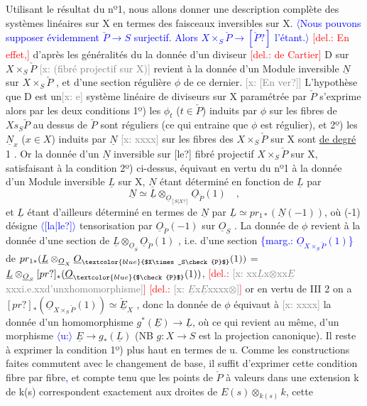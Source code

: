\documentclass[11pt]{article}
\newcommand{\hand}[1]{\textcolor{blue}{#1}}
\let\over\relax
\newcommand{\over}[2]{\textcolor{gray}{#1}\textcolor{blue}{\ensuremath{^{\!\nearrow}}#2}}
\newcommand{\inserted}[2][]{\textcolor{blue}{$\langle$#2$\rangle$}}
\newcommand{\margin}[1]{\textcolor{blue}{\{\textsf{marg.:} #1\}}}
\newcommand{\deleted}[1]{\textcolor{red}{[\textsf{del.:} #1]}}
\newcommand{\xout}[1]{\textcolor{gray}{[\textsf{x:} #1]}}
\newcommand{\uline}[1]{\underline{#1}}
\newcommand{\unsure}[1]{[#1?]}
\begin{document}
Utilisant le résultat du nº1, nous allons donner une description
complète des systèmes linéaires sur X en termes des faisceaux inversibles
sur X. \inserted{Nous pouvons supposer évidemment $\check{P}\to S$ surjectif. Alors $X\times_S\check{P}\to \unsure{\check{P}}$ l'étant.} \deleted{En effet,} d'après les généralités du \over{nº2}{\unsure{\S 20.3}} la donnée d'un
diviseur \deleted{de Cartier} D sur $X\times_S\check{P}$ \xout{(fibré projectif sur X)} revient à la
donnée d'un Module inversible $\underline{N}$ sur $X\times_S\check{P}$ , et d'une section régulière
$\phi$ de ce dernier. \xout{\unsure{En ver}} L'hypothèse que D est un\xout{e} système linéaire de
diviseurs sur X paramétrée par $\check{P}$ s'exprime alors par les deux conditions
1º) les $\phi_t$ ($t\in\check{P}$) induits par $\phi$ sur les fibres de $Xs_S\check{P}$ au dessus de $\check{P}$
sont réguliers (ce qui entraine que $\phi$ est régulier), et 2º) les $\underline{N}_x$ ($x\in X$)
induits par $\underline{N}$ \xout{xxxx} sur les fibres des $X\times_S\check{P}$ sur X sont \uline{de degré} 1 .
Or la donnée d'un $\underline{N}$ inversible sur \unsure{le} fibré projectif $X\times_S\check{P}$ sur X,
satisfaisant à la condition 2º) ci-dessus, équivaut en vertu du nº1
à la donnée d'un Module inversible $\underline{L}$ sur X, $\underline{N}$ étant déterminé en fonction
de $\underline{L}$ par
\[ \underline{N}\simeq\underline{L}\otimes_{\underline{O}_{\unsure{S|X}}}\underline{O}_{\check{P}}(1) \quad , \]
et $\underline{L}$ étant d'ailleurs déterminé en termes de $\underline{N}$ par $\underline{L}\simeq pr_{1*}(\underline{N}(-1))$,
où (-1) désigne \inserted{\unsure{la|le}} tensorisation par $\underline{O}_{\check{P}}(-1)$ sur $\underline{O}_S$ . La donnée de $\phi$
revient à la donnée d'une section de $\underline{L}\otimes_{\underline{O}_S}\underline{O}_{\check{P}}(1)$ , i.e. d'une section
\margin{$\underline{O}_{X\times_S\check{P}}(1)$}
de $pr_{1*}(\underline{L}\otimes_{\underline{O}_X}\underline{O}_{\hand{$X\times_S\check{P}$}}(1))$ = $\underline{L}\otimes_{\underline{O}_S}\unsure{pr}_*(\underline{O}_{\hand{$\check{P}$}}(1))$, \deleted{\xout{xx$\underline{L}$x$\otimes$xx$\underline{E}$xxxi.e.xxd'unxhomomorphisme}}
\deleted{\xout{$\underline{E}$x$\underline{E}$xxxx$\otimes$}} or en vertu de III 2 on a $\unsure{pr}_*(\underline{O}_{X\times_S\check{P}}(1))\simeq\check{\underline{E}}_X$ , donc
la donnée de $\phi$ équivaut à \xout{xxxx} la donnée d'un homomorphisme $g^*(\underline{E})\to\underline{L}$,
où ce qui revient au même, d'un morphisme \inserted{u:} $\underline{E}\to g_*(\underline{L})$ (NB $g:X\to S$ est
la projection canonique). Il reste à exprimer la condition 1º) plus
haut en termes de u. Comme les constructions faites commutent avec le
changement de base, il suffit d'exprimer cette condition fibre par fibre\hand{,}
et compte tenu que les points de $\check{P}$ à valeurs dans une extension k de
k(s) correspondent exactement aux droites de $E(s)\otimes_{k(s)}k$, cette
\end{document}
